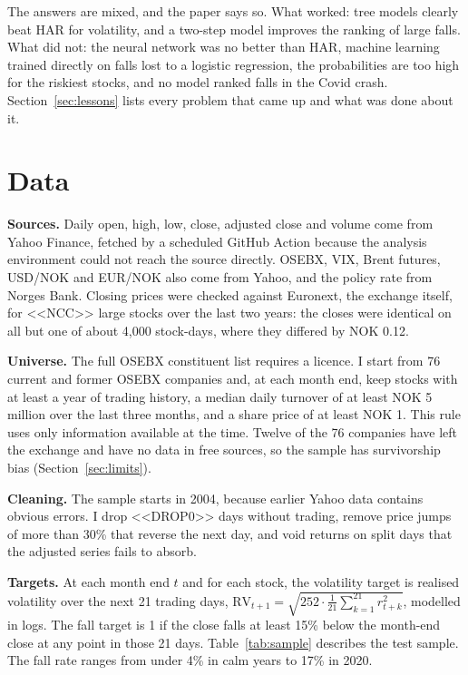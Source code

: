 \documentclass[11pt,a4paper]{article}
\begin{document}
The answers are mixed, and the paper says so. What worked: tree models clearly beat HAR for volatility, and a two-step model improves the ranking of large falls. What did not: the neural network was no better than HAR, machine learning trained directly on falls lost to a logistic regression, the probabilities are too high for the riskiest stocks, and no model ranked falls in the Covid crash. Section~\ref{sec:lessons} lists every problem that came up and what was done about it.

\section{Data}
\label{sec:data}
\textbf{Sources.} Daily open, high, low, close, adjusted close and volume come from Yahoo Finance, fetched by a scheduled GitHub Action because the analysis environment could not reach the source directly. OSEBX, VIX, Brent futures, USD/NOK and EUR/NOK also come from Yahoo, and the policy rate from Norges Bank. Closing prices were checked against Euronext, the exchange itself, for <<NCC>> large stocks over the last two years: the closes were identical on all but one of about 4,000 stock-days, where they differed by NOK 0.12.

\textbf{Universe.} The full OSEBX constituent list requires a licence. I start from 76 current and former OSEBX companies and, at each month end, keep stocks with at least a year of trading history, a median daily turnover of at least NOK 5 million over the last three months, and a share price of at least NOK 1. This rule uses only information available at the time. Twelve of the 76 companies have left the exchange and have no data in free sources, so the sample has survivorship bias (Section~\ref{sec:limits}).

\textbf{Cleaning.} The sample starts in 2004, because earlier Yahoo data contains obvious errors. I drop <<DROP0>> days without trading, remove price jumps of more than 30\% that reverse the next day, and void returns on split days that the adjusted series fails to absorb.

\textbf{Targets.} At each month end $t$ and for each stock, the volatility target is realised volatility over the next 21 trading days, $\mathrm{RV}_{t+1} = \sqrt{252 \cdot \tfrac{1}{21}\sum_{k=1}^{21} r_{t+k}^2}$, modelled in logs. The fall target is 1 if the close falls at least 15\% below the month-end close at any point in those 21 days. Table~\ref{tab:sample} describes the test sample. The fall rate ranges from under 4\% in calm years to 17\% in 2020.
\end{document}
